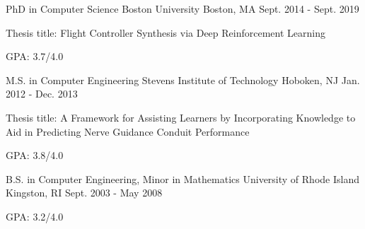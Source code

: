 

\begin{cventries}
  \cventry
    {PhD in Computer Science} %
    {Boston University} %
    {Boston, MA} %
    {Sept. 2014 - Sept. 2019} %
    {
      \begin{cvitems} %
        \item {Thesis title: Flight Controller Synthesis via Deep Reinforcement Learning}
        \item {GPA: 3.7/4.0}
      \end{cvitems}
    }

  \cventry
    {M.S. in Computer Engineering} %
    {Stevens Institute of Technology} %
    {Hoboken, NJ} %
    {Jan. 2012 - Dec. 2013} %
    {
      \begin{cvitems} %
        \item {Thesis title: A Framework for Assisting Learners by Incorporating Knowledge to Aid in Predicting Nerve Guidance Conduit Performance}
        \item {GPA: 3.8/4.0}
      \end{cvitems}
    }


  \cventry
    {B.S. in Computer Engineering, Minor in Mathematics} %
    {University of Rhode Island} %
    {Kingston, RI} %
    {Sept. 2003 - May 2008} %
    {
      \begin{cvitems} %
        \item {GPA: 3.2/4.0}
      \end{cvitems}
    }

\end{cventries}
